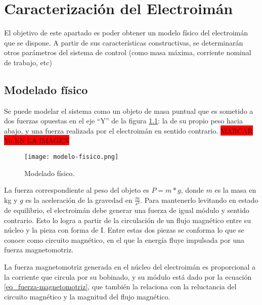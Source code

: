 \chapter{Caracterización del  Electroimán}  \label{cap:CaracterizacionElectroiman}

\noindent El objetivo de este apartado es poder obtener un modelo físico del electroimán que se dispone. A partir de sus características constructivas, se determinarán otros parámetros del sistema de control (como masa máxima, corriente nominal de trabajo, etc)


\section{Modelado físico}




\noindent Se puede modelar el sistema como un objeto de masa puntual que es sometido a dos fuerzas opuestas en el eje “Y” de la figura \ref{fig:img_modelado-fisico}: la de su propio peso hacia abajo, y una fuerza realizada por el electroimán en sentido contrario. \colorbox{red}{MARCAR Yo EN LA IMAGEN}

\begin{figure}[H]
	\centering
	\texttt{[image: modelo-fisico.png]}
	\caption{Modelado físico.}
	\label{fig:img_modelado-fisico}
\end{figure}

\noindent La fuerza correspondiente al peso del objeto es $P=m*g$, donde $m$ es la masa en kg y $g$ es la aceleración de la gravedad en $\frac{m}{s^{2}}$. Para mantenerlo levitando en estado de equilibrio, el electroimán debe generar una fuerza de igual módulo y sentido contrario. Esto lo logra a partir de la circulación de un flujo magnético entre su núcleo y la pieza con forma de I. Entre estas dos piezas se conforma lo que se conoce como circuito magnético, en el que la energía fluye impulsada por una fuerza magnetomotriz.

\noindent La fuerza magnetomotriz generada en el núcleo del electroimán es proporcional a la corriente que circula por su bobinado, y su módulo está dado por la ecuación \ref{eq_fuerza-magnetomotriz}, que también la relaciona con la reluctancia del circuito magnético y la magnitud del flujo magnético.

